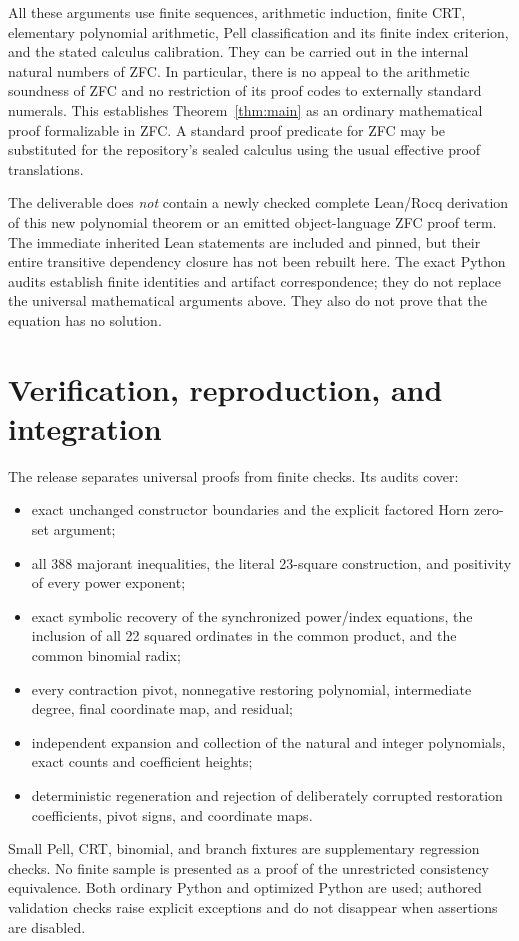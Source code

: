 \documentclass[11pt,letterpaper]{article}
\theoremstyle{definition}\newtheorem{definition}[theorem]{Definition}
\theoremstyle{remark}\newtheorem{remark}[theorem]{Remark}
\begin{document}
All these arguments use finite sequences, arithmetic induction, finite
CRT, elementary polynomial arithmetic, Pell classification and its
finite index criterion, and the stated calculus calibration. They can
be carried out in the internal natural numbers of ZFC. In particular,
there is no appeal to the arithmetic soundness of ZFC and no restriction
of its proof codes to externally standard numerals. This establishes
Theorem~\ref{thm:main} as an ordinary mathematical proof formalizable
in ZFC. A standard proof predicate for ZFC may be substituted for the
repository's sealed calculus using the usual effective proof translations.

The deliverable does \emph{not} contain a newly checked complete
Lean/Rocq derivation of this new polynomial theorem or an emitted
object-language ZFC proof term. The immediate inherited Lean statements
are included and pinned, but their entire transitive dependency closure
has not been rebuilt here. The exact Python audits establish finite
identities and artifact correspondence; they do not replace the universal
mathematical arguments above. They also do not prove that the equation
has no solution.

\section{Verification, reproduction, and integration}

The release separates universal proofs from finite checks. Its audits cover:
\begin{itemize}
\item exact unchanged constructor boundaries and the explicit factored
      Horn zero-set argument;
\item all 388 majorant inequalities, the literal 23-square construction,
      and positivity of every power exponent;
\item exact symbolic recovery of the synchronized power/index equations,
      the inclusion of all 22 squared ordinates in the common product,
      and the common binomial radix;
\item every contraction pivot, nonnegative restoring polynomial,
      intermediate degree, final coordinate map, and residual;
\item independent expansion and collection of the natural and integer
      polynomials, exact counts and coefficient heights;
\item deterministic regeneration and rejection of deliberately corrupted
      restoration coefficients, pivot signs, and coordinate maps.
\end{itemize}
Small Pell, CRT, binomial, and branch fixtures are supplementary regression
checks. No finite sample is presented as a proof of the unrestricted
consistency equivalence. Both ordinary Python and optimized Python
are used; authored validation checks raise explicit exceptions and do
not disappear when assertions are disabled.
\end{document}
